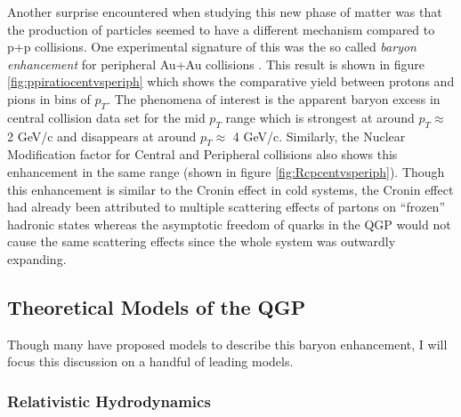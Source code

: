 Another surprise encountered when studying this new phase of matter was that the production of particles seemed to have a different mechanism compared to p+p collisions. One experimental signature of this was the so called \textit{baryon enhancement} for peripheral Au+Au collisions \citep{PhysRevLett.97.152301}. This result is shown in figure \ref{fig:ppiratiocentvsperiph} which shows the comparative yield between protons and pions in bins of $p_{T}$. The phenomena of interest is the apparent baryon excess in central collision data set for the mid $p_{T}$ range which is strongest at around $p_{T}\approx$ 2 GeV/c and disappears at around $p_{T}\approx$ 4 GeV/c. Similarly, the Nuclear Modification factor for Central and Peripheral collisions also shows this enhancement in the same range (shown in figure \ref{fig:Rcpcentvsperiph}). Though this enhancement is similar to the Cronin effect in cold systems, the Cronin effect had already been attributed to multiple scattering effects of partons on ``frozen'' hadronic states whereas the asymptotic freedom of quarks in the QGP would not cause the same scattering effects since the whole system was outwardly expanding.

\subsection{Theoretical Models of the QGP}
Though many have proposed models to describe this baryon enhancement, I will focus this discussion on a handful of leading models.

\subsubsection{Relativistic Hydrodynamics}


